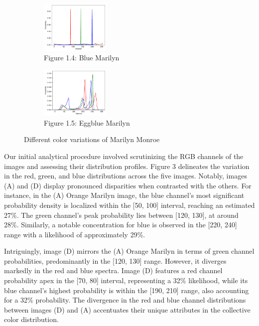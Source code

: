 \documentclass{article}
\begin{document}
\begin{figure}[ht]
  \begin{minipage}{0.6\textwidth}
    \centering
    \begin{subfigure}{0.45\textwidth}
      \centering
      \includegraphics[width=125px]{main_files/figure-latex/2_4_blue_marilyn_dist.pdf}
      \caption{Figure 1.4: Blue Marilyn}
      \label{fig:1_4_blue_marilyn}
    \end{subfigure}
    \hfill
    \begin{subfigure}{0.45\textwidth}
      \centering
      \includegraphics[width=125px]{main_files/figure-latex/2_5_eggblue_marilyn_dist.pdf}
      \caption{Figure 1.5: Eggblue Marilyn}
      \label{fig:1_5_eggblue_marilyn}
    \end{subfigure}
  \end{minipage}

  \caption{Different color variations of Marilyn Monroe}
  \label{fig:marilyn_variations}
\end{figure}

Our initial analytical procedure involved scrutinizing the RGB channels
of the images and assessing their distribution profiles. Figure 3
delineates the variation in the red, green, and blue distributions
across the five images. Notably, images (A) and (D) display pronounced
disparities when contrasted with the others. For instance, in the (A)
Orange Marilyn image, the blue channel's most significant probability
density is localized within the {[}50, 100{]} interval, reaching an
estimated 27\%. The green channel's peak probability lies between
{[}120, 130{]}, at around 28\%. Similarly, a notable concentration for
blue is observed in the {[}220, 240{]} range with a likelihood of
approximately 29\%.

Intriguingly, image (D) mirrors the (A) Orange Marilyn in terms of green
channel probabilities, predominantly in the {[}120, 130{]} range.
However, it diverges markedly in the red and blue spectra. Image (D)
features a red channel probability apex in the {[}70, 80{]} interval,
representing a 32\% likelihood, while its blue channel's highest
probability is within the {[}190, 210{]} range, also accounting for a
32\% probability. The divergence in the red and blue channel
distributions between images (D) and (A) accentuates their unique
attributes in the collective color distribution.
\end{document}
